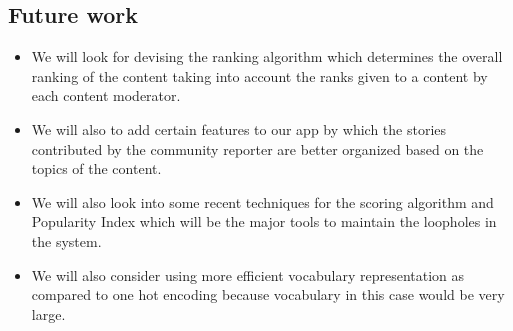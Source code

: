 \documentclass[11pt]{article}
\begin{document}
		\subsection{Future work}
		\begin{itemize}
		    \item 
	
			We will look for devising the ranking algorithm	which determines the overall ranking of the content taking into account the ranks given to a content by each content moderator.
			
			\item We will also to add certain features to our app by which the stories contributed by the community reporter are better organized based on the topics of the content.
			
			\item We will also look into some recent techniques for the scoring algorithm and Popularity Index which will be the major tools to maintain the loopholes in the system. 
			
			\item We will also consider using more efficient vocabulary representation as compared to one hot encoding because vocabulary in this case would be very large.
			
		\end{itemize}				
\end{document}
